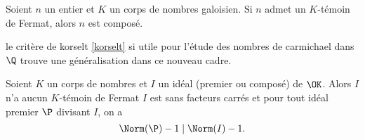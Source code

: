 \begin{theoreme}\label{ptf-contraposee}
	Soient $n$ un entier et $K$ un corps de nombres galoisien. Si $n$ admet un $K$-témoin de Fermat, alors $n$ est composé.
\end{theoreme}

le critère de korselt \ref{korselt} si utile pour l'étude des nombres de carmichael dans $\Q$ trouve une généralisation dans ce nouveau cadre.

\begin{theoreme}\label{korselt-generalise}
	Soient $K$ un corps de nombres et $I$ un idéal (premier ou composé) de $\OK$. Alors $I$ n'a aucun $K$-témoin de Fermat \ssi $I$ est sans facteurs carrés et pour tout idéal premier $\P$ divisant $I$, on a $$\Norm(\P) - 1 \mid \Norm(I) - 1.$$
\end{theoreme}

